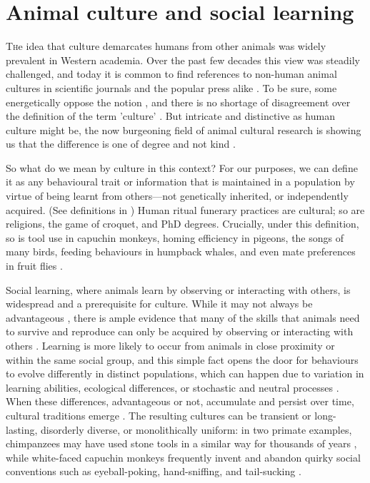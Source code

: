 
\section{Animal culture and social learning }
\lettrine[lines=2,slope=0pt, nindent=5pt]The idea that culture demarcates humans from other animals was widely prevalent in Western academia. Over the past few decades this view was steadily challenged, and today it is common to find references to non-human animal cultures in scientific journals and the popular press alike \autocite{whiten2019}. To be sure, some energetically oppose the notion \parencite{galef1992, sahlins1976, laland2006}, and there is no shortage of disagreement over the definition of the term 'culture’ \autocite{heyes2020,kroeber1952,laland2003}. But intricate and distinctive as human culture might be, the now burgeoning field of animal cultural research is showing us that the difference is one of degree and not kind \autocite{whiten2017a}.

So what do we mean by culture in this context? For our purposes, we can define it as any behavioural trait or information that is maintained in a population by virtue of being learnt from others---not genetically inherited, or independently acquired. (See definitions in \cite{whiten2017a, laland2003}) Human ritual funerary practices are cultural; so are religions, the game of croquet, and PhD degrees. Crucially, under this definition, so is tool use in capuchin monkeys, homing efficiency in pigeons, the songs of many birds, feeding behaviours in humpback whales, and even mate preferences in fruit flies \autocite{allen2013,danchin2018,falotico2019,sasaki2017,slater2003a}. 

Social learning, where animals learn by observing or interacting with others, is widespread and a prerequisite for culture. While it may not always be advantageous \autocite{Giraldeau2002,henrich1998,whitehead2009}, there is ample evidence that many of the skills that animals need to survive and reproduce can only be acquired by observing or interacting with others \autocite{Galef2005}. Learning is more likely to occur from animals in close proximity or within the same social group, and this simple fact opens the door for behaviours to evolve differently in distinct populations, which can happen due to variation in learning abilities, ecological differences, or stochastic and neutral processes \autocite{aplin2016,Araya-Salas2019,mesoudi2016}. When these differences, advantageous or not, accumulate and persist over time, cultural traditions emerge \autocite{nunn2009,tchernichovski2017}. The resulting cultures can be transient or long-lasting, disorderly diverse, or monolithically uniform: in two primate examples, chimpanzees may have used stone tools in a similar way for thousands of years \autocite{carvalho2008,mercader2007}, while white-faced capuchin monkeys frequently invent and abandon quirky social conventions such as eyeball-poking, hand-sniffing, and tail-sucking \autocite{Perry2003}. 

